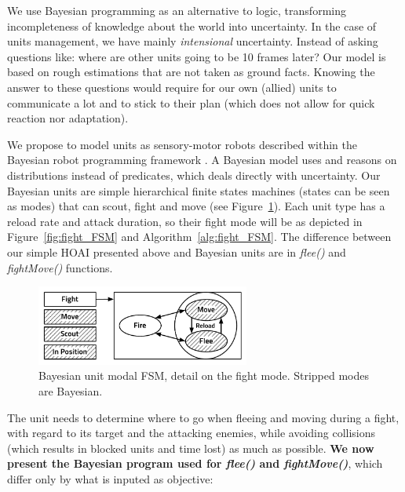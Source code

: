 We use Bayesian programming as an alternative to logic, transforming incompleteness of knowledge about the world into uncertainty. In the case of units management, we have mainly \textit{intensional} uncertainty. Instead of asking questions like: where are other units going to be 10 frames later? Our model is based on rough estimations that are not taken as ground facts. Knowing the answer to these questions would require for our own (allied) units to communicate a lot and to stick to their plan (which does not allow for quick reaction nor adaptation). 

We propose to model units as sensory-motor robots described within the Bayesian robot programming framework \citep{Lebeltel04}. A Bayesian model uses and reasons on distributions instead of predicates, which deals directly with uncertainty. %
Our Bayesian units are simple hierarchical finite states machines (states can be seen as modes) that can scout, fight and move (see Figure~\ref{fig:unit_HFSM}). Each unit type has a reload rate and attack duration, so their fight mode will be as depicted in Figure~\ref{fig:fight_FSM} and Algorithm~\ref{alg:fight_FSM}. The difference between our simple HOAI presented above and Bayesian units are in \textit{flee()} and \textit{fightMove()} functions.
\begin{figure}[h]
\begin{center}
\includegraphics[width=7cm]{images/unit_HFSM2.pdf}
\end{center}
\caption{Bayesian unit modal FSM, detail on the fight mode. Stripped modes are Bayesian.}
\label{fig:unit_HFSM}
\end{figure}

The unit needs to determine where to go when fleeing and moving during a fight, with regard to its target and the attacking enemies, while avoiding collisions (which results in blocked units and time lost) as much as possible. \textbf{We now present the Bayesian program used for \textit{flee()} and \textit{fightMove()}}, which differ only by what is inputed as objective:
